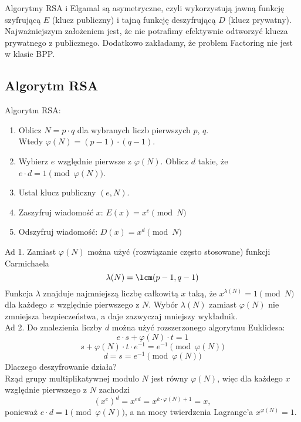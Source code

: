 Algorytmy RSA i Elgamal są asymetryczne, czyli wykorzystują jawną funkcję szyfrującą \( E \) (klucz publiczny) i tajną funkcję deszyfrującą \( D \) (klucz prywatny).
Najważniejszym założeniem jest, że nie potrafimy efektywnie odtworzyć klucza prywatnego z publicznego. Dodatkowo zakładamy, że problem Factoring nie jest w klasie BPP.

\subsection{Algorytm RSA}
\begin{greyframe}
	Algorytm RSA:
	\begin{enumerate}
		\item Oblicz \( N = p \cdot q \) dla wybranych liczb pierwszych \( p \), \( q \). \\
		      Wtedy \( \varphi(N) = (p-1) \cdot (q-1) \).
		\item Wybierz \( e \) względnie pierwsze z \( \varphi(N) \). Oblicz \( d \) takie, że  \( e\cdot d = 1 \pmod{\varphi(N)} \).
		\item Ustal klucz publiczny \( (e, N) \).
		\item Zaszyfruj wiadomość \( x \): \( E(x) = x^e \pmod{N} \)
		\item Odszyfruj wiadomość: \( D(x) = x^d \pmod{N} \)
	\end{enumerate}
\end{greyframe}

Ad 1. Zamiast \( \varphi(N) \) można użyć (rozwiązanie często stosowane) funkcji Carmichaela
\[
	\lambda(N) = \lcm(p - 1, q - 1)
\]
Funkcja \( \lambda \) znajduje najmniejszą liczbę całkowitą \( x \) taką, że \( x^{\lambda(N)} = 1 \pmod{N} \) dla każdego \( x \) względnie pierwszego z \( N \).
Wybór \( \lambda(N) \) zamiast \( \varphi(N) \) nie zmniejsza bezpieczeństwa, a daje zazwyczaj mniejszy wykładnik. \\
Ad 2. Do znalezienia liczby \( d \) można użyć rozszerzonego algorytmu Euklidesa:
\[
	e \cdot s + \varphi(N) \cdot t = 1
\]
\[
	s + \varphi(N) \cdot t \cdot e^{-1} = e^{-1} \pmod{\varphi(N)}
\]
\[
	d = s = e^{-1} \pmod{\varphi(N)}
\]
Dlaczego deszyfrowanie działa? \\
Rząd grupy multiplikatywnej modulo \( N \) jest równy \( \varphi(N) \), więc dla każdego \( x \) względnie pierwszego z \( N \) zachodzi
\[
	(x^{e})^d = x^{ed} = x^{k \cdot \varphi(N) + 1} = x,
\]
ponieważ \( e \cdot d = 1 \pmod{\varphi(N)} \), a na mocy twierdzenia Lagrange'a \( x^{\varphi(N)} = 1 \).

